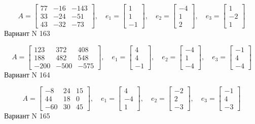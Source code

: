 \documentclass[11pt]{report}
\begin{document}
$$A = \left[\begin{matrix}77 & -16 & -143\\33 & -24 & -51\\43 & -32 & -73\end{matrix}\right],\quad e_1 = \left[\begin{matrix}1\\1\\-1\end{matrix}\right],\quad e_2 = \left[\begin{matrix}-4\\1\\2\end{matrix}\right],\quad e_3 = \left[\begin{matrix}1\\-2\\1\end{matrix}\right]$$Вариант N 163

$$A = \left[\begin{matrix}123 & 372 & 408\\188 & 482 & 548\\-200 & -500 & -575\end{matrix}\right],\quad e_1 = \left[\begin{matrix}4\\4\\-1\end{matrix}\right],\quad e_2 = \left[\begin{matrix}-4\\1\\-4\end{matrix}\right],\quad e_3 = \left[\begin{matrix}-1\\4\\-4\end{matrix}\right]$$Вариант N 164

$$A = \left[\begin{matrix}-8 & 24 & 15\\44 & 18 & 0\\-60 & 30 & 45\end{matrix}\right],\quad e_1 = \left[\begin{matrix}4\\-4\\1\end{matrix}\right],\quad e_2 = \left[\begin{matrix}-2\\2\\-3\end{matrix}\right],\quad e_3 = \left[\begin{matrix}-1\\4\\-3\end{matrix}\right]$$Вариант N 165
\end{document}
